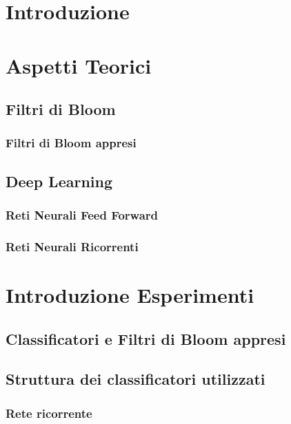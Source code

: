 \documentclass{article}
\begin{document}
\section{Introduzione}

\section{Aspetti Teorici}
\subsection{Filtri di Bloom}
\subsubsection{Filtri di Bloom appresi}
\subsection{Deep Learning} %
\subsubsection{Reti Neurali Feed Forward}
\subsubsection{Reti Neurali Ricorrenti}

\section{Introduzione Esperimenti}

\subsection{Classificatori e Filtri di Bloom appresi}

\subsection{Struttura dei classificatori utilizzati}
\subsubsection{Rete ricorrente}
\end{document}
